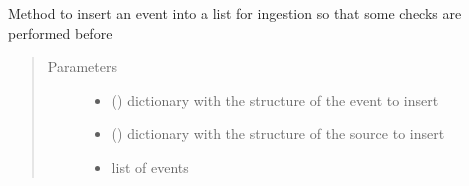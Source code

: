 
\begin{fulllineitems}
\label{\detokenize{eboa.ingestion:eboa.ingestion.functions.insert_event_for_ingestion}}
Method to insert an event into a list for ingestion so that some checks are performed before
\begin{quote}\begin{description}
\item[{Parameters}] \leavevmode\begin{itemize}
\item {} 
 () \textendash{} dictionary with the structure of the event to insert

\item {} 
 () \textendash{} dictionary with the structure of the source to insert

\item {} 
 \textendash{} list of events

\end{itemize}

\end{description}\end{quote}

\end{fulllineitems}


